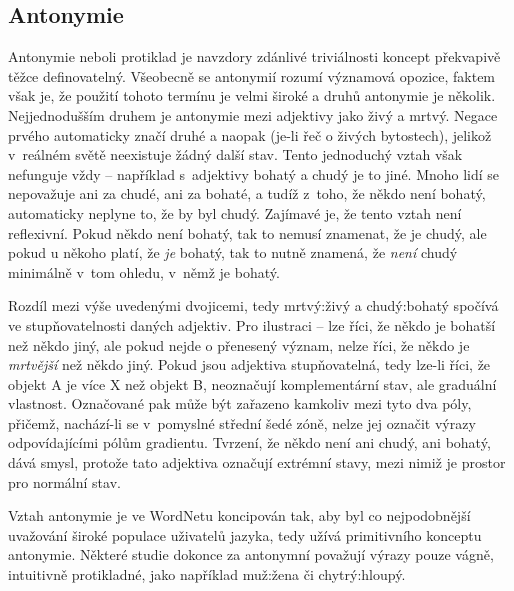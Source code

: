 \documentclass[a4paper, 11pt, oneside, showtrims]{book}
\newcommand\ex{\textsf}
\begin{document}

				\subsection{Antonymie}

					Antonymie neboli protiklad je navzdory zdánlivé triviálnosti koncept překvapivě těžce definovatelný. Všeobecně se antonymií rozumí významová opozice, faktem však je, že použití tohoto termínu je velmi široké a druhů antonymie je několik. Nejjednodušším druhem je antonymie mezi adjektivy jako \ex{živý} a \ex{mrtvý}. Negace prvého automaticky značí druhé a naopak (je-li řeč o živých bytostech), jelikož v~reálném světě neexistuje žádný další stav. Tento jednoduchý vztah však nefunguje vždy -- například s~adjektivy \ex{bohatý} a \ex{chudý} je to jiné. Mnoho lidí se nepovažuje ani za chudé, ani za bohaté, a tudíž z~toho, že někdo není bohatý, automaticky neplyne to, že by byl chudý. \parencite{miller1990introduction} Zajímavé je, že tento vztah není reflexivní. Pokud někdo není bohatý, tak to nemusí znamenat, že je chudý, ale pokud u někoho platí, že \textit{je} bohatý, tak to nutně znamená, že \textit{není} chudý minimálně v~tom ohledu, v~němž je bohatý. \parencite{paradis2006antonymy} 

					Rozdíl mezi výše uvedenými dvojicemi, tedy \ex{mrtvý:živý} a \ex{chudý:bohatý} spočívá ve stupňovatelnosti daných adjektiv. Pro ilustraci -- lze říci, že někdo je \ex{bohatší} než někdo jiný, ale pokud nejde o přenesený význam, nelze říci, že někdo je \ex{\textit{mrtvější}} než někdo jiný. Pokud jsou adjektiva stupňovatelná, tedy lze-li říci, že objekt A je více X než objekt B, neoznačují komplementární stav, ale graduální vlastnost. Označované pak může být zařazeno kamkoliv mezi tyto dva póly, přičemž, nachází-li se v~pomyslné střední šedé zóně, nelze jej označit výrazy odpovídajícími pólům gradientu. Tvrzení, že někdo \ex{není ani chudý, ani bohatý}, dává smysl, protože tato adjektiva označují extrémní stavy, mezi nimiž je prostor pro normální stav. \parencite{paradis2006antonymy} 

					Vztah antonymie je ve WordNetu koncipován tak, aby byl co nejpodobnější uvažování široké populace uživatelů jazyka, tedy užívá primitivního konceptu antonymie. Některé studie dokonce za antonymní považují výrazy pouze vágně, intuitivně protikladné, jako například \ex{muž:žena} či \ex{chytrý:hloupý}. \parencite{lehrer1982antonymy}
\end{document}
